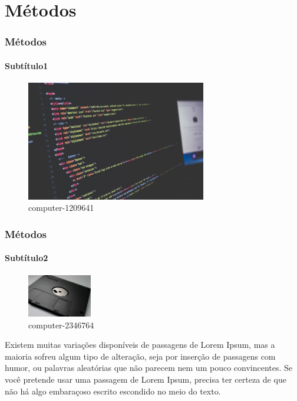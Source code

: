 \documentclass{beamer}
\begin{document}
    \section{Métodos} %
    \begin{frame}
      \frametitle{Métodos}
      \framesubtitle{Subtítulo1}
      \begin{figure}[hbt]
        \begin{center}
        \caption{computer-1209641~\cite{computer-1209641}}
        \includegraphics[width=0.70\textwidth]{img/computer-1209641_1280.jpg}
        \end{center}
      \end{figure}
    \end{frame}
    
    
    \begin{frame}
      \frametitle{Métodos}
      \framesubtitle{Subtítulo2}
    
      \begin{figure}[htb]
        \begin{center}
          \caption{computer-2346764~\cite{computer-2346764}}
          \includegraphics[width=0.25\textwidth]{img/computer-2346764_1280.jpg}
        \end{center}
      \end{figure}
      \bigskip
      Existem muitas variações disponíveis de passagens de Lorem Ipsum, mas a maioria sofreu algum tipo de alteração, seja por inserção de passagens com humor, ou palavras aleatórias que não parecem nem um pouco convincentes. Se você pretende usar uma passagem de Lorem Ipsum, precisa ter certeza de que não há algo embaraçoso escrito escondido no meio do texto. 
    \end{frame}
    
\end{document}
